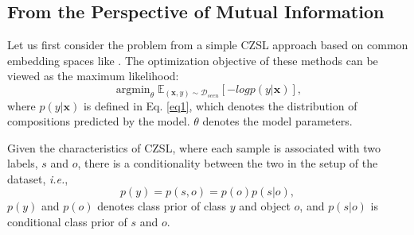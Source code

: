 \documentclass[letterpaper]{article} %
\newcommand{\mx}{\mathbf{x}}
\newcommand{\ie}{\textit{i.e.}}
\theoremstyle{definition}
\begin{document}
\subsection{From the Perspective of Mutual Information} \label{subsec_mutal}
Let us first consider the problem from a simple CZSL approach based on common embedding spaces like \cite{mancini2021open,naeem2021learning}. The optimization objective of these methods can be viewed as the maximum likelihood:
	\begin{equation}
		\operatorname{argmin}_{\theta}\mathbb{E}_{(\mx,y)\sim \mathcal{D}_{seen}}[-logp(y|\mx)],
        \label{eq_objective}
	\end{equation}
where $p(y|\mx)$ is defined in Eq. \ref{eq1}, which denotes the distribution of compositions predicted by the model. $\theta$ denotes the model parameters.

Given the characteristics of CZSL, where each sample is associated with two labels, $s$ and $o$, there is a conditionality between the two in the setup of the dataset, \ie,
	\begin{equation}
		p(y)=p(s,o)=p(o)p(s|o),
        \label{eq_condition}
	\end{equation}
$p(y)$ and $p(o)$ denotes class prior of class $y$ and object $o$, and $p(s|o)$ is conditional class prior of $s$ and $o$. 
\end{document}

